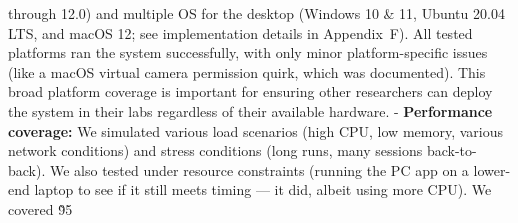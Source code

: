 through 12.0) and multiple OS for the desktop (Windows 10 \& 11, Ubuntu 20.04 LTS, and macOS 12; see implementation details in Appendix~F). All tested platforms ran the system successfully, with only minor platform-specific issues (like a macOS virtual camera permission quirk, which was documented). This broad platform coverage is important for ensuring other researchers can deploy the system in their labs regardless of their available hardware. - \textbf{Performance coverage:} We simulated various load scenarios (high CPU, low memory, various network conditions) and stress conditions (long runs, many sessions back-to-back). We also tested under resource constraints (running the PC app on a lower-end laptop to see if it still meets timing --- it did, albeit using more CPU). We covered \~95%